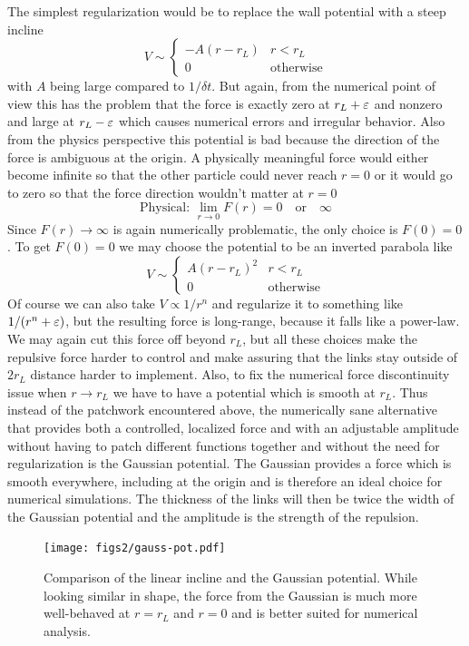 \documentclass[endfloats,nofootinbib,preprint,floatfix,titlepage,superscriptaddress]{revtex4} %
\begin{document}
The simplest regularization would be to replace the wall potential with a steep incline
\[V \sim \begin{cases} -A(r -r_L) & r< r_L \\
0 & \mbox{otherwise} 
\end{cases}\]
with $A$ being large compared to $1/\delta t$. 
But again, from the numerical point of view this has the problem that the force is exactly zero at $r_L+\varepsilon$ and nonzero and large at $r_L - \varepsilon$ which causes numerical errors and irregular behavior. Also from the physics perspective this potential is bad because the direction of the force is ambiguous at the origin. A physically meaningful force would either become infinite so that the other particle could never reach $r=0$ or it would go to zero so that the force direction wouldn't matter at $r=0$
\[\mbox{Physical: } \lim_{r\to 0} F(r) = 0 \quad \mbox{or}\quad \infty \]
Since $F(r)\to \infty$ is again numerically problematic, the only choice is $F(0) = 0$. To get $F(0) = 0$ we may choose the potential to be an inverted parabola like
\[V \sim \begin{cases} A(r -r_L)^2 & r< r_L \\
0 & \mbox{otherwise} 
\end{cases}\]
Of course we can also take $V\propto 1/r^n$ 
and regularize it to something like $1/(r^n+\varepsilon)$, but the resulting force is long-range, because it falls like a power-law. We may again cut this force off beyond $r_L$, but all these choices make the repulsive force harder to control and make assuring that the links stay outside of $2r_L$ distance harder to implement. 
Also, to fix the numerical force discontinuity issue when $r\to r_L$ we have to have a potential which is smooth at $r_L$. Thus instead of the patchwork encountered above, the numerically  sane 
alternative that provides both a controlled, localized force and with an adjustable amplitude without having to patch different functions together and without the need for regularization is the Gaussian potential. 
The Gaussian provides a force which is smooth everywhere, including at the origin and is therefore an ideal choice for numerical simulations. 
The thickness of the links will then be twice the width of the Gaussian potential and the amplitude is the strength of the repulsion.  

\begin{figure}
    \centering
    \texttt{[image: figs2/gauss-pot.pdf]}
    \caption{Comparison of the linear incline and the Gaussian potential. While looking similar in shape, the force from the Gaussian is much more well-behaved at $r= r_L$ and $r=0$ and is better suited for numerical analysis. }
    \label{fig:gauss}
\end{figure}
\end{document}
